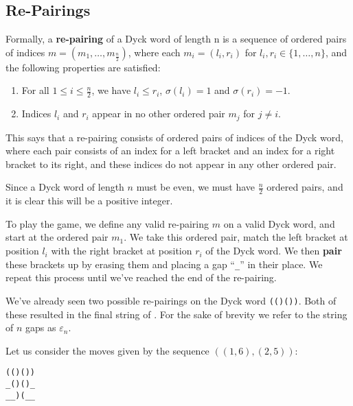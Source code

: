 \subsection{Re-Pairings}
\begin{definition}
    Formally, a \textbf{re-pairing} of a Dyck word of length n is a sequence of ordered pairs of indices $m = (m_{1}, \dots, m_{\frac{n}{2}})$, where each $m_{i} = (l_{i}, r_{i})$ for $l_{i}, r_{i} \in \{1,\dots,n\}$, and the following properties are satisfied:
    \begin{enumerate}
        \item For all $1\leq i\leq \frac{n}{2}$, we have $l_{i} \leq r_{i}$, $\sigma(l_{i}) = 1$ and $\sigma(r_{i}) = -1$. 
        \item Indices $l_{i}$ and $r_{i}$ appear in no other ordered pair $m_{j}$ for $j \neq i$.
    \end{enumerate}
\end{definition}

This says that a re-pairing consists of ordered pairs of indices of the Dyck word, where each pair consists of an index for a left bracket and an index for a right bracket to its right, and these indices do not appear in any other ordered pair.

Since a Dyck word of length $n$ must be even, we must have $\frac{n}{2}$ ordered pairs, and it is clear this will be a positive integer.

To play the game, we define any valid re-pairing $m$ on a valid Dyck word, and start at the ordered pair $m_{1}$. We take this ordered pair, match the left bracket at position $l_{i}$ with the right bracket at position $r_{i}$ of the Dyck word. We then \textbf{pair} these brackets up by erasing them and placing a gap ``\texttt{\string_}'' in their place. We repeat this process until we've reached the end of the re-pairing.

We've already seen two possible re-pairings on the Dyck word \texttt{(()())}. Both of these resulted in the final string of . For the sake of brevity we refer to the string of $n$ gaps as $\varepsilon_{n}$. 

Let us consider the moves given by the sequence $((1,6),(2, 5))$:

\null
\begin{center}
    \texttt{(()())} \\
    \texttt{\string_()()\string_} \\
    \texttt{\string_\string_)(\string_\string_}
\end{center}
\null

